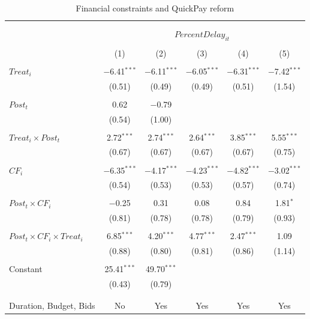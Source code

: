 \documentclass[]{article}
\begin{document}
\begin{table}[H] \centering 
  \caption{Financial constraints and QuickPay reform} 
  \label{} 
\small 
\begin{tabular}{@{\extracolsep{-2pt}}lccccc} 
\\[-1.8ex]\hline 
\hline \\[-1.8ex] 
\\[-1.8ex] & \multicolumn{5}{c}{$PercentDelay_{it}$  } \\ 
\\[-1.8ex] & (1) & (2) & (3) & (4) & (5)\\ 
\hline \\[-1.8ex] 
 $Treat_i$ & $-$6.41$^{***}$ & $-$6.11$^{***}$ & $-$6.05$^{***}$ & $-$6.31$^{***}$ & $-$7.42$^{***}$ \\ 
  & (0.51) & (0.49) & (0.49) & (0.51) & (1.54) \\ 
  & & & & & \\ 
 $Post_t$ & 0.62 & $-$0.79 &  &  &  \\ 
  & (0.54) & (1.00) &  &  &  \\ 
  & & & & & \\ 
 $Treat_i \times Post_t$ & 2.72$^{***}$ & 2.74$^{***}$ & 2.64$^{***}$ & 3.85$^{***}$ & 5.55$^{***}$ \\ 
  & (0.67) & (0.67) & (0.67) & (0.67) & (0.75) \\ 
  & & & & & \\ 
 $CF_i$ & $-$6.35$^{***}$ & $-$4.17$^{***}$ & $-$4.23$^{***}$ & $-$4.82$^{***}$ & $-$3.02$^{***}$ \\ 
  & (0.54) & (0.53) & (0.53) & (0.57) & (0.74) \\ 
  & & & & & \\ 
 $Post_t \times CF_i$ & $-$0.25 & 0.31 & 0.08 & 0.84 & 1.81$^{*}$ \\ 
  & (0.81) & (0.78) & (0.78) & (0.79) & (0.93) \\ 
  & & & & & \\ 
 $Post_t \times CF_i \times Treat_i$ & 6.85$^{***}$ & 4.20$^{***}$ & 4.77$^{***}$ & 2.47$^{***}$ & 1.09 \\ 
  & (0.88) & (0.80) & (0.81) & (0.86) & (1.14) \\ 
  & & & & & \\ 
 Constant & 25.41$^{***}$ & 49.70$^{***}$ &  &  &  \\ 
  & (0.43) & (0.79) &  &  &  \\ 
  & & & & & \\ 
\hline \\[-1.8ex] 
Duration, Budget, Bids & No & Yes & Yes & Yes & Yes \\ 

\end{tabular}
\end{table}
\end{document}
